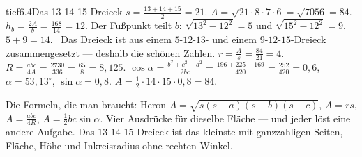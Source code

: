 \begin{loesungkarte}{tief}{6.4}{Das 13-14-15-Dreieck}
$s = \frac{13 + 14 + 15}2 = 21$. $A = \sqrt{21\cdot8\cdot7\cdot6} = \sqrt{7056} = 84$.
$h_b = \frac{2A}b = \frac{168}{14} = 12$. Der Fußpunkt teilt $b$: $\sqrt{13^{2} - 12^{2}} = 5$ und $\sqrt{15^{2} - 12^{2}} = 9$, $5 + 9 = 14$. \checkmark\ Das Dreieck ist aus einem $5$-$12$-$13$- und einem $9$-$12$-$15$-Dreieck zusammengesetzt --- deshalb die schönen Zahlen.
$r = \frac As = \frac{84}{21} = 4$. $R = \frac{abc}{4A} = \frac{2730}{336} = \frac{65}8 = 8{,}125$.
$\cos\alpha = \frac{b^{2} + c^{2} - a^{2}}{2bc} = \frac{196 + 225 - 169}{420} = \frac{252}{420} = 0{,}6$, $\alpha = 53{,}13^{\circ}$, $\sin\alpha = 0{,}8$. $A = \frac12\cdot14\cdot15\cdot0{,}8 = 84$. \checkmark
{}
\begin{mitnehmen}\kastentext
Die Formeln, die man braucht: Heron $A = \sqrt{s(s - a)(s - b)(s - c)}$, $A = rs$, $A = \frac{abc}{4R}$, $A = \frac12bc\sin\alpha$. Vier Ausdrücke für dieselbe Fläche --- und jeder löst eine andere Aufgabe. Das $13$-$14$-$15$-Dreieck ist das kleinste mit ganzzahligen Seiten, Fläche, Höhe und Inkreisradius ohne rechten Winkel.
\end{mitnehmen}
\end{loesungkarte}

